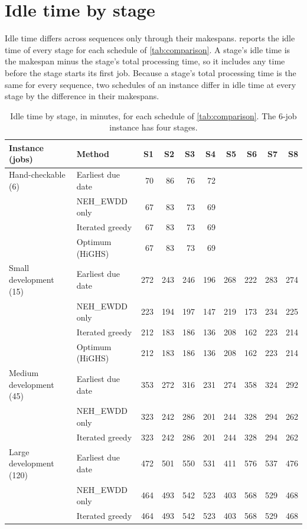 \section{Idle time by stage}\label{sec:idle}

\sumpara Idle time differs across sequences only through their makespans. \sumparaend
\fin {} reports the idle time of every stage for each schedule of \cref{tab:comparison}. \fine
\fin A stage's idle time is the makespan minus the stage's total processing time, so it includes any time before the stage starts its first job. \fine
\fin Because a stage's total processing time is the same for every sequence, two schedules of an instance differ in idle time at every stage by the difference in their makespans. \fine

\begin{table}[!htbp]
\centering
\caption{Idle time by stage, in minutes, for each schedule of \cref{tab:comparison}. The 6-job instance has four stages.}
\label{tab:idle}
\small
\setlength{\tabcolsep}{3.5pt}
\begin{tabular}{llrrrrrrrr}
\toprule
Instance (jobs) & Method & S1 & S2 & S3 & S4 & S5 & S6 & S7 & S8 \\
\midrule
Hand-checkable (6) & Earliest due date & 70 & 86 & 76 & 72 &  &  &  &  \\
 & NEH\_EWDD only & 67 & 83 & 73 & 69 &  &  &  &  \\
 & Iterated greedy & 67 & 83 & 73 & 69 &  &  &  &  \\
 & Optimum (HiGHS) & 67 & 83 & 73 & 69 &  &  &  &  \\
\midrule
Small development (15) & Earliest due date & 272 & 243 & 246 & 196 & 268 & 222 & 283 & 274 \\
 & NEH\_EWDD only & 223 & 194 & 197 & 147 & 219 & 173 & 234 & 225 \\
 & Iterated greedy & 212 & 183 & 186 & 136 & 208 & 162 & 223 & 214 \\
 & Optimum (HiGHS) & 212 & 183 & 186 & 136 & 208 & 162 & 223 & 214 \\
\midrule
Medium development (45) & Earliest due date & 353 & 272 & 316 & 231 & 274 & 358 & 324 & 292 \\
 & NEH\_EWDD only & 323 & 242 & 286 & 201 & 244 & 328 & 294 & 262 \\
 & Iterated greedy & 323 & 242 & 286 & 201 & 244 & 328 & 294 & 262 \\
\midrule
Large development (120) & Earliest due date & 472 & 501 & 550 & 531 & 411 & 576 & 537 & 476 \\
 & NEH\_EWDD only & 464 & 493 & 542 & 523 & 403 & 568 & 529 & 468 \\
 & Iterated greedy & 464 & 493 & 542 & 523 & 403 & 568 & 529 & 468 \\
\bottomrule
\end{tabular}
\end{table}
